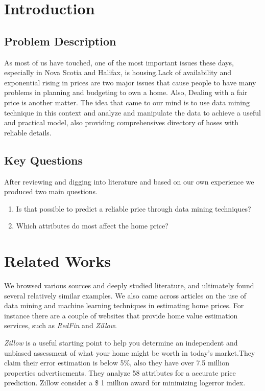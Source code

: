 \documentclass{article}
\begin{document}
\section{Introduction}
\subsection{Problem Description}
As most of us have touched, one of the most important issues these days, especially in Nova Scotia and Halifax, is housing.Lack of availability and exponential rising in prices are two major issues that cause people to have many problems in planning and budgeting to own a home. Also, Dealing with a fair price is another matter.
The idea that came to our mind is to use data mining technique in this context and analyze and manipulate the data to achieve a useful and practical model, also providing comprehensives directory of hoses with reliable details.
\subsection{Key Questions}
After reviewing and digging into literature and based on our own experience we produced two main questions.
 
\begin{enumerate}
    \item Is that possible to predict a reliable price through data mining techniques?
    \item Which attributes do most affect the home price?
\end{enumerate}

\section{Related Works}
We browsed various sources and deeply studied literature, and ultimately found several relatively similar examples. We also came across articles on the use of data mining and machine learning techniques in estimating home prices. For instance there are a couple of websites that provide home value estimation services, such as \emph{RedFin} and \emph{Zillow}.

\emph{Zillow} is a useful starting point to help you determine an independent and unbiased assessment of what your home might be worth in today’s market.They claim their error estimation is below 5\%, also they have over 7.5 million properties advertisements. They analyze 58 attributes for a accurate price prediction. Zillow consider a \$ 1 million award for minimizing logerror index.
\end{document}

